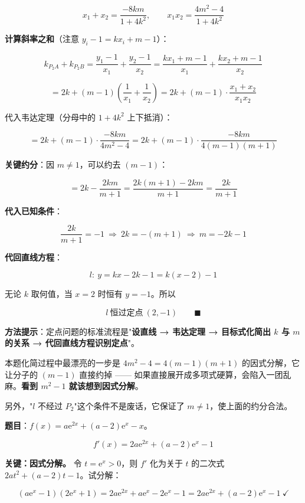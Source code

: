 \[x_1+x_2=\frac{-8km}{1+4k^{2}},\qquad x_1x_2=\frac{4m^{2}-4}{1+4k^{2}}\]

\textbf{计算斜率之和}（注意 $y_i-1=kx_i+m-1$）：

\[k_{P_2A}+k_{P_2B}=\frac{y_1-1}{x_1}+\frac{y_2-1}{x_2}=\frac{kx_1+m-1}{x_1}+\frac{kx_2+m-1}{x_2}\]

\[=2k+(m-1)\left(\frac1{x_1}+\frac1{x_2}\right)=2k+(m-1)\cdot\frac{x_1+x_2}{x_1x_2}\]

代入韦达定理（分母中的 $1+4k^{2}$ 上下抵消）：

\[=2k+(m-1)\cdot\frac{-8km}{4m^{2}-4}=2k+(m-1)\cdot\frac{-8km}{4(m-1)(m+1)}\]

\textbf{关键约分}：因 $m\ne1$，可以约去 $(m-1)$：

\[=2k-\frac{2km}{m+1}=\frac{2k(m+1)-2km}{m+1}=\frac{2k}{m+1}\]

\textbf{代入已知条件}：

\[\frac{2k}{m+1}=-1\ \Longrightarrow\ 2k=-(m+1)\ \Longrightarrow\ m=-2k-1\]

\textbf{代回直线方程}：

\[l:\ y=kx-2k-1=k(x-2)-1\]

无论 $k$ 取何值，当 $x=2$ 时恒有 $y=-1$。所以

\[l\ \text{恒过定点}\ (2,-1)\qquad\blacksquare\]

\begin{gktip}
\textbf{方法提示}：定点问题的标准流程是"\textbf{设直线 → 韦达定理 → 目标式化简出 $k$ 与 $m$ 的关系 → 代回直线方程识别定点}"。

本题化简过程中最漂亮的一步是 $4m^{2}-4=4(m-1)(m+1)$ 的因式分解，它让分子的 $(m-1)$ 直接约掉 —— 如果直接展开成多项式硬算，会陷入一团乱麻。\textbf{看到 $m^{2}-1$ 就该想到因式分解}。

另外，"$l$ 不经过 $P_2$"这个条件不是废话，它保证了 $m\ne1$，使上面的约分合法。
\end{gktip}

\par\medskip


\textbf{题目}：$f(x)=a\mathrm e^{2x}+(a-2)\mathrm e^{x}-x$。


\[f'(x)=2a\mathrm e^{2x}+(a-2)\mathrm e^{x}-1\]

\textbf{关键：因式分解。} 令 $t=\mathrm e^{x}>0$，则 $f'$ 化为关于 $t$ 的二次式 $2at^{2}+(a-2)t-1$。试分解：

\[\left(a\mathrm e^{x}-1\right)\left(2\mathrm e^{x}+1\right)=2a\mathrm e^{2x}+a\mathrm e^{x}-2\mathrm e^{x}-1=2a\mathrm e^{2x}+(a-2)\mathrm e^{x}-1\ \checkmark\]


